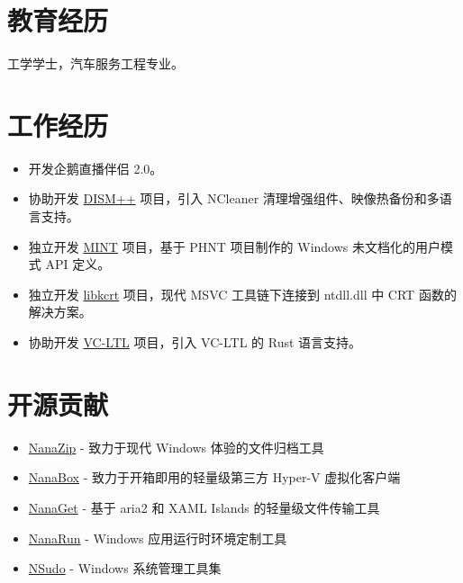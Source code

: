 \documentclass{resume}
\begin{document}
\renewcommand\headrulewidth{0pt}



\section{教育经历}

  工学学士，汽车服务工程专业。

\section{工作经历}

\begin{itemize}
  \item 开发企鹅直播伴侣 2.0。
\end{itemize}

\begin{itemize}
  \item 协助开发 \href{https://github.com/Chuyu-Team/Dism-Multi-language/releases/latest}{DISM++} 项目，引入 NCleaner 清理增强组件、映像热备份和多语言支持。
  \item 独立开发 \href{https://github.com/Chuyu-Team/MINT}{MINT} 项目，基于 PHNT 项目制作的 Windows 未文档化的用户模式 API 定义。
  \item 独立开发 \href{https://github.com/Chuyu-Team/libkcrt}{libkcrt} 项目，现代 MSVC 工具链下连接到 ntdll.dll 中 CRT 函数的解决方案。
  \item 协助开发 \href{https://github.com/Chuyu-Team/VC-LTL5}{VC-LTL} 项目，引入 VC-LTL 的 Rust 语言支持。
\end{itemize}

\section{开源贡献}

\begin{itemize}
  \item \href{https://github.com/M2Team/NanaZip}{NanaZip} - 致力于现代 Windows 体验的文件归档工具
  \item \href{https://github.com/M2Team/NanaBox}{NanaBox} - 致力于开箱即用的轻量级第三方 Hyper-V 虚拟化客户端
  \item \href{https://github.com/M2Team/NanaGet}{NanaGet} - 基于 aria2 和 XAML Islands 的轻量级文件传输工具
  \item \href{https://github.com/M2Team/NanaRun}{NanaRun} - Windows 应用运行时环境定制工具
  \item \href{https://github.com/M2Team/NSudo}{NSudo} - Windows 系统管理工具集
\end{itemize} 
\end{document}
